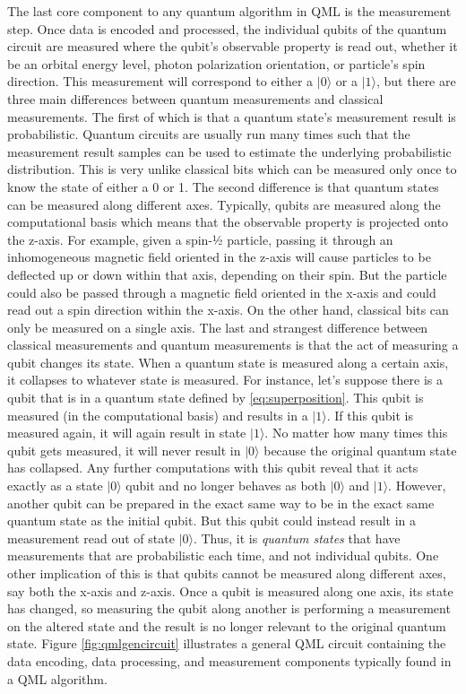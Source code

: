 \documentclass[
	a4paper, %
	10pt, %
	unnumberedsections, %
	twoside, %
]{LTJournalArticle}
\newcommand{\ket}[1]{\lvert#1\rangle} %
\begin{document}
The last core component to any quantum algorithm in QML is the measurement step. Once data is encoded and processed, the individual qubits of the quantum circuit are measured where the qubit's 
observable property is read out, whether it be an orbital energy level, photon polarization orientation, or particle's spin direction. This measurement will correspond to either a $\ket{0}$ or 
a $\ket{1}$, but there are three main differences between quantum measurements and classical measurements. The first of which is that a quantum state's measurement result is probabilistic. 
Quantum circuits are usually run many times such that the measurement result samples can be used to estimate the underlying probabilistic distribution. This is very unlike classical bits which 
can be measured only once to know the state of either a 0 or 1. The second difference is that quantum states can be measured along different axes. Typically, qubits are measured along the 
computational basis which means that the observable property is projected onto the z-axis. For example, given a spin-½ particle, passing it through an inhomogeneous magnetic field oriented in 
the z-axis will cause particles to be deflected up or down within that axis, depending on their spin. But the particle could also be passed through a magnetic field oriented in the x-axis and 
could read out a spin direction within the x-axis. On the other hand, classical bits can only be measured on a single axis. The last and strangest difference between classical measurements and 
quantum measurements is that the act of measuring a qubit changes its state. When a quantum state is measured along a certain axis, it collapses to whatever state is measured. For instance, 
let's suppose there is a qubit that is in a quantum state defined by \ref{eq:superposition}. This qubit is measured (in the computational basis) and results in a $\ket{1}$. If this qubit is
measured again, it will again result in state $\ket{1}$. No matter how many times this qubit gets measured, it will never result in $\ket{0}$ because the original quantum state has collapsed. 
Any further computations with this qubit reveal that it acts exactly as a state $\ket{0}$ qubit and no longer behaves as both $\ket{0}$ and $\ket{1}$. However, another qubit can be prepared in 
the exact same way to be in the exact same quantum state as the initial qubit. But this qubit could instead result in a measurement read out of state $\ket{0}$. Thus, it is \emph{quantum states} that 
have measurements that are probabilistic each time, and not individual qubits. One other implication of this is that qubits cannot be measured along different axes, say both the x-axis and 
z-axis. Once a qubit is measured along one axis, its state has changed, so measuring the qubit along another is performing a measurement on the altered state and the result is no longer relevant 
to the original quantum state. Figure \ref{fig:qmlgencircuit} illustrates a general QML circuit containing the data encoding, data processing, and measurement components typically found in a QML algorithm.
\end{document}
